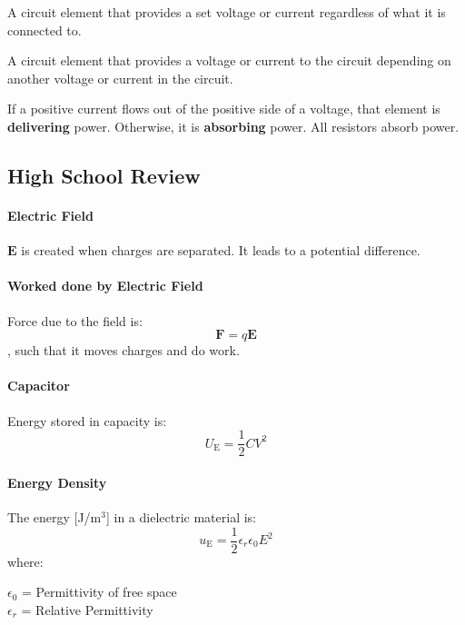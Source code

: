 \documentclass[11pt]{article}
\begin{document}
    \begin{definition}
    A circuit element that provides a set voltage or current regardless of what it is connected to.
    \end{definition}
    
    \begin{definition}
    A circuit element that provides a voltage or current to the circuit depending on another voltage or current in the circuit.
    \end{definition}
    
    \begin{definition}
    If a positive current flows out of the positive side of a voltage, that element is \textbf{delivering} power. Otherwise, it is \textbf{absorbing} power. All resistors absorb power.
    \end{definition}
\subsection{High School Review}
\paragraph{Electric Field} $\textbf{E}$ is created when charges are separated. It leads to a potential difference.
\paragraph{Worked done by Electric Field} Force due to the field is:
\begin{equation}
    \textbf{F} = q\textbf{E}
\end{equation}
, such that it moves charges and do work.
\paragraph{Capacitor} Energy stored in capacity is:
\begin{equation}
    U_\text{E} = \frac{1}{2}CV^2
\end{equation}
\paragraph{Energy Density} The energy [J/m$^3$] in a dielectric material is:
\begin{equation}
    u_\text{E} = \frac{1}{2}\epsilon_r \epsilon_0 E^2
\end{equation}
where:
\begin{center}
    $\epsilon_0$ = Permittivity of free space \\
    $\epsilon_r$ = Relative Permittivity
\end{center}
\end{document}
